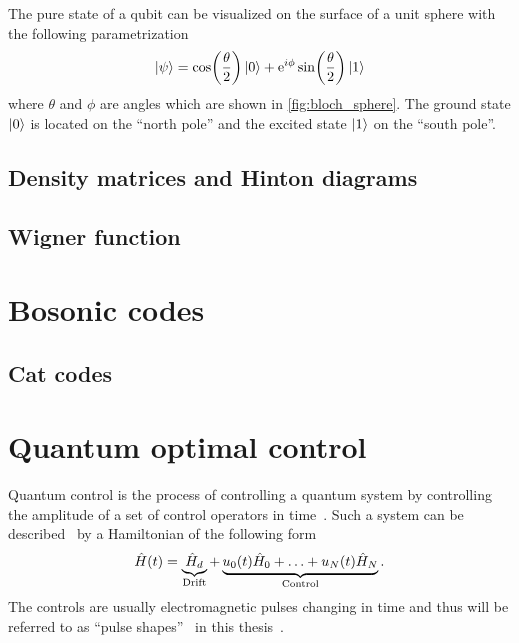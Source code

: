 \documentclass[main.tex]{subfiles}
\begin{document}
The pure state of a qubit can be visualized on the surface of a unit sphere with the following parametrization
\begin{equation}
    \ket{\psi} = \cos(\frac{\theta}{2})\ket{0} + \mathrm{e}^{i\phi}\sin(\frac{\theta}{2})\ket{1}
\end{equation}
where \( \theta \) and \( \phi \) are angles which are shown in \cref{fig:bloch_sphere}.
The ground state \(\ket{0}\) is located on the ``north pole'' and the excited state \(\ket{1}\) on the ``south pole''.


\subsection{Density matrices and Hinton diagrams}


\subsection{Wigner function}

\section{Bosonic codes}

\subsection{Cat codes}


\section{Quantum optimal control}
Quantum control is the process of controlling a quantum system by controlling the amplitude of a set of control operators in time~\cite{fisher_optimal_2010}.
Such a system can be described~\cite{fisher_optimal_2010} by a Hamiltonian of the following form
\begin{equation}
    \hat{H}(t) = \underbrace{\hat{H}_d}_{\text{Drift}} + \underbrace{u_0(t)\hat{H}_0 + \dotsc + u_N(t)\hat{H}_N}_{\text{Control}}.
    \label{eq:optimal-control-hamiltonian}
\end{equation}
The controls are usually electromagnetic pulses changing in time and thus will be referred to as ``pulse shapes''~\cite{fisher_optimal_2010} in this thesis~.
\end{document}
